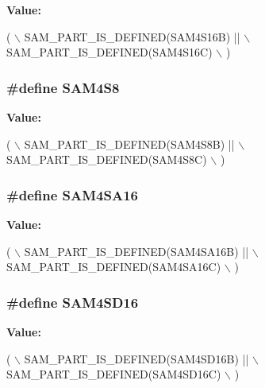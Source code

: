 {\bfseries Value\-:}
\begin{DoxyCode}
( \(\backslash\)
        SAM\_PART\_IS\_DEFINED(SAM4S16B) || \(\backslash\)
        SAM\_PART\_IS\_DEFINED(SAM4S16C) \(\backslash\)
        )
\end{DoxyCode}
\hypertarget{group__sam__part__macros__group_ga04e32c037894a537ffb6193413693cb0}{
\subsubsection[{S\-A\-M4\-S8}]{\setlength{\rightskip}{0pt plus 5cm}\#define S\-A\-M4\-S8}}\label{group__sam__part__macros__group_ga04e32c037894a537ffb6193413693cb0}
{\bfseries Value\-:}
\begin{DoxyCode}
( \(\backslash\)
        SAM\_PART\_IS\_DEFINED(SAM4S8B) || \(\backslash\)
        SAM\_PART\_IS\_DEFINED(SAM4S8C) \(\backslash\)
        )
\end{DoxyCode}
\hypertarget{group__sam__part__macros__group_ga51a0ff030b5d9e555653a4227538a888}{
\subsubsection[{S\-A\-M4\-S\-A16}]{\setlength{\rightskip}{0pt plus 5cm}\#define S\-A\-M4\-S\-A16}}\label{group__sam__part__macros__group_ga51a0ff030b5d9e555653a4227538a888}
{\bfseries Value\-:}
\begin{DoxyCode}
( \(\backslash\)
        SAM\_PART\_IS\_DEFINED(SAM4SA16B) || \(\backslash\)
        SAM\_PART\_IS\_DEFINED(SAM4SA16C)    \(\backslash\)
    )
\end{DoxyCode}
\hypertarget{group__sam__part__macros__group_ga817106c645da5be09dd37af37d7fb805}{
\subsubsection[{S\-A\-M4\-S\-D16}]{\setlength{\rightskip}{0pt plus 5cm}\#define S\-A\-M4\-S\-D16}}\label{group__sam__part__macros__group_ga817106c645da5be09dd37af37d7fb805}
{\bfseries Value\-:}
\begin{DoxyCode}
( \(\backslash\)
        SAM\_PART\_IS\_DEFINED(SAM4SD16B) || \(\backslash\)
        SAM\_PART\_IS\_DEFINED(SAM4SD16C)    \(\backslash\)
    )
\end{DoxyCode}
